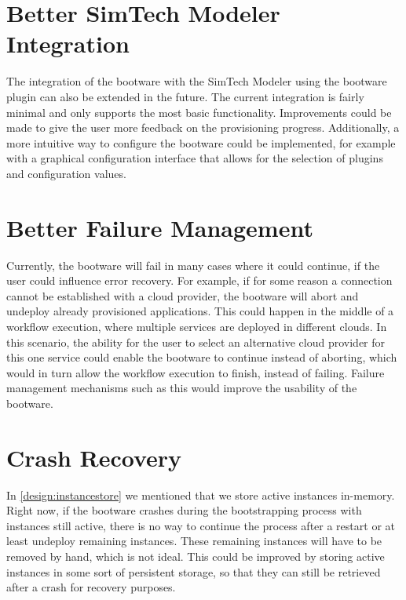 \vspace{-0.4cm}

\section{Better SimTech Modeler Integration}

\vspace{-0.1cm}

The integration of the bootware with the SimTech Modeler using the bootware plugin can also be extended in the future.
The current integration is fairly minimal and only supports the most basic functionality.
Improvements could be made to give the user more feedback on the provisioning progress.
Additionally, a more intuitive way to configure the bootware could be implemented, for example with a graphical configuration interface that allows for the selection of plugins and configuration values.

\vspace{-0.4cm}

\section{Better Failure Management}

\vspace{-0.1cm}

Currently, the bootware will fail in many cases where it could continue, if the user could influence error recovery.
For example, if for some reason a connection cannot be established with a cloud provider, the bootware will abort and undeploy already provisioned applications.
This could happen in the middle of a workflow execution, where multiple services are deployed in different clouds.
In this scenario, the ability for the user to select an alternative cloud provider for this one service could enable the bootware to continue instead of aborting, which would in turn allow the workflow execution to finish, instead of failing.
Failure management mechanisms such as this would improve the usability of the bootware.

\vspace{-0.4cm}

\section{Crash Recovery}

\vspace{-0.1cm}

In \autoref{design:instancestore} we mentioned that we store active instances in-memory.
Right now, if the bootware crashes during the bootstrapping process with instances still active, there is no way to continue the process after a restart or at least undeploy remaining instances.
These remaining instances will have to be removed by hand, which is not ideal.
This could be improved by storing active instances in some sort of persistent storage, so that they can still be retrieved after a crash for recovery purposes.

